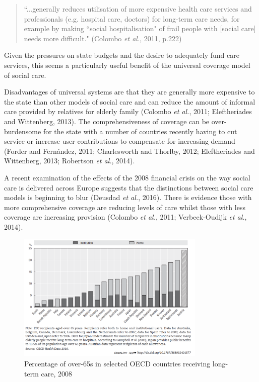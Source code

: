 \documentclass[12pt,a4paper,oneside,table]{report}
\begin{document}
\begin{quotation} 
``...generally reduces utilisation of more expensive health care services and professionals (e.g. hospital care, doctors) for long-term care needs, for example by making ``social hospitalisation" of frail people with [social care] needs more difficult." \hfill(Colombo \emph{et al.}, 2011, p.222)\end{quotation}

Given the pressures on state budgets and the desire to adequately fund
care services, this seems a particularly useful benefit of the universal
coverage model of social care.

Disadvantages of universal systems are that they are generally more
expensive to the state than other models of social care and can reduce
the amount of informal care provided by relatives for elderly family
(Colombo \emph{et al.}, 2011; Eleftheriades and Wittenberg, 2013). The
comprehensiveness of coverage can be over-burdensome for the state with
a number of countries recently having to cut service or increase
user-contributions to compensate for increasing demand (Forder and
Fernández, 2011; Charlesworth and Thorlby, 2012; Eleftheriades and
Wittenberg, 2013; Robertson \emph{et al.}, 2014).

A recent examination of the effects of the 2008 financial crisis on the
way social care is delivered across Europe suggests that the
distinctions between social care models is beginning to blur (Deusdad
\emph{et al.}, 2016). There is evidence those with more comprehensive
coverage are reducing levels of care whilst those with less coverage are
increasing provision (Colombo \emph{et al.}, 2011; Verbeek-Oudijk
\emph{et al.}, 2014).

\begin{figure}[h]
  \centering
    \includegraphics[width=0.8\textwidth]{figures/chapter-lit-review/oecd-comparison.pdf}
    \caption{Percentage of over-65s in selected OECD countries receiving long-term care, 2008}
    \label{fig:oecd-comparison}
\end{figure}
\end{document}

